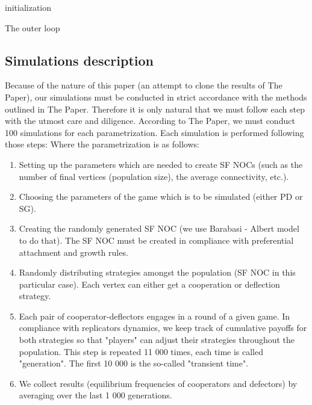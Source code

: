 \documentclass[english, twoside, 12pt, a4paper]{article}
\theoremstyle{definition}
\theoremstyle{plain}
\theoremstyle{remark}
\begin{document}
 \begin{algorithm}[H]
  initialization\;
  \caption{The outer loop}
 \end{algorithm}
 



\subsection{Simulations description}

Because of the nature of this paper (an attempt to clone the results of The Paper), our simulations must be conducted in strict accordance with the methods outlined
in The Paper. Therefore it is only natural that we must follow each step with the utmost care and diligence. According to The Paper, we must conduct 100 simulations 
for each parametrization. Each simulation is performed following those steps: Where the parametrization is as follows:
\begin{enumerate}
  \item Setting up the parameters which are needed to create SF NOCs (such as the number of final vertices (population size), the average connectivity, etc.).
  \item Choosing the parameters of the game which is to be simulated (either PD or SG).
  \item Creating the randomly generated SF NOC (we use Barabasi - Albert model to do that). The SF NOC must be created in compliance with preferential attachment and 
  growth rules.
  \item Randomly distributing strategies amongst the population (SF NOC in this particular case). Each vertex can either get a cooperation or deflection strategy.
  \item Each pair of cooperator-deflectors engages in a round of a given game. In compliance with replicators dynamics, we keep track of cumulative payoffs for both 
  strategies so that "players" can adjust their strategies throughout the population. This step is repeated 11 000 times, each time is called "generation". The first 
  10 000 is the so-called "transient time".
  \item We collect results (equilibrium frequencies of cooperators and defectors) by averaging over the last 1 000 generations.
\end{enumerate}
\end{document}
